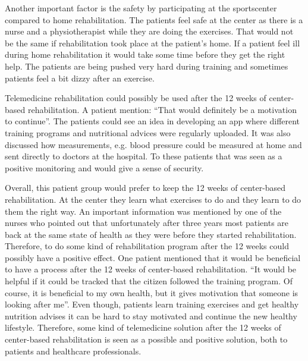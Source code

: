 Another important factor is the safety by participating at the sportscenter compared to home rehabilitation. The patients feel safe at the center as there is a nurse and a physiotherapist while they are doing the exercises. That would not be the same if rehabilitation took place at the patient’s home. If a patient feel ill during home rehabilitation it would take some time before they get the right help. The patients are being pushed very hard during training and sometimes patients feel a bit dizzy after an exercise. 

Telemedicine rehabilitation could possibly be used after the 12 weeks of center-based rehabilitation. A patient mention: “That would definitely be a motivation to continue”. The patients could see an idea in developing an app where different training programs and nutritional advices were regularly uploaded. It was also discussed how measurements, e.g. blood pressure could be measured at home and sent directly to doctors at the hospital. To these patients that was seen as a positive monitoring and would give a sense of security.  

Overall, this patient group would prefer to keep the 12 weeks of center-based rehabilitation. At the center they learn what exercises to do and they learn to do them the right way. An important information was mentioned by one of the nurses who pointed out that unfortunately after three years most patients are back at the same state of health as they were before they started rehabilitation. Therefore, to do some kind of rehabilitation program after the 12 weeks could possibly have a positive effect. One patient mentioned that it would be beneficial to have a process after the 12 weeks of center-based rehabilitation. “It would be helpful if it could be tracked that the citizen followed the training program. Of course, it is beneficial to my own health, but it gives motivation that someone is looking after me”. Even though, patients learn training exercises and get healthy nutrition advises it can be hard to stay motivated and continue the new healthy lifestyle. Therefore, some kind of telemedicine solution after the 12 weeks of center-based rehabilitation is seen as a possible and positive solution, both to patients and healthcare professionals.        


















































